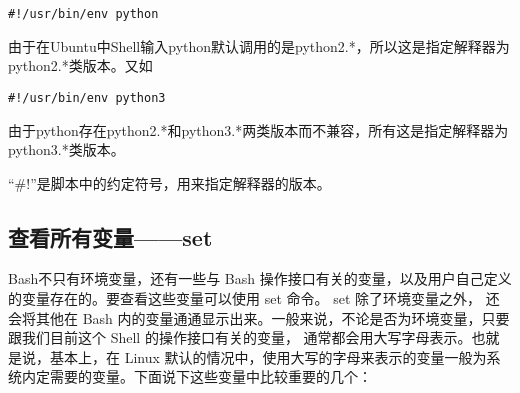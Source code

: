 \verb|#!/usr/bin/env python|

由于在Ubuntu中Shell输入python默认调用的是python2.*，所以这是指定解释器为python2.*类版本。又如

\verb|#!/usr/bin/env python3|

由于python存在python2.*和python3.*两类版本而不兼容，所有这是指定解释器为python3.*类版本。

``\#!''是脚本中的约定符号，用来指定解释器的版本。



\subsection{查看所有变量——set}
Bash不只有环境变量，还有一些与 Bash 操作接口有关的变量，以及用户自己定义的变量存在的。要查看这些变量可以使用 set 命令。 set 除了环境变量之外， 还会将其他在 Bash 内的变量通通显示出来。一般来说，不论是否为环境变量，只要跟我们目前这个 Shell 的操作接口有关的变量， 通常都会用大写字母表示。也就是说，基本上，在 Linux 默认的情况中，使用大写的字母来表示的变量一般为系统内定需要的变量。下面说下这些变量中比较重要的几个：
